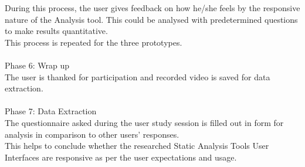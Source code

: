 During this process, the user gives feedback on how he/she feels by the responsive nature of the Analysis tool. This could be analysed with predetermined questions to make results quantitative. \\

This process is repeated for the three prototypes.\\\\

Phase 6: Wrap up \\

The user is thanked for participation and recorded video is saved for data extraction.\\\\

Phase 7: Data Extraction\\

The questionnaire asked during the user study session is filled out in form for analysis in comparison to other users’ responses.\\

This helps to conclude whether the researched Static Analysis Tools User Interfaces are responsive as per the user expectations and usage.\\
